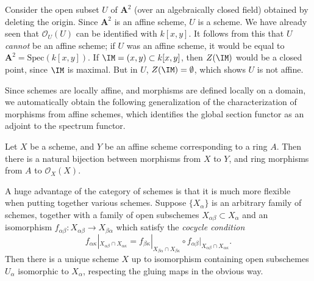 \begin{example}
    Consider the open subset $U$ of $\mathbf{A}^2$ (over an algebraically closed field) obtained by deleting the origin. Since $\mathbf{A}^2$ is an affine scheme, $U$ is a scheme. We have already seen that $\mathcal{O}_U(U)$ can be identified with $k[x,y]$. It follows from this that $U$ \emph{cannot} be an affine scheme; if $U$ was an affine scheme, it would be equal to $\mathbf{A}^2 = \text{Spec}(k[x,y])$. If $\IM = (x,y) \subset k[x,y]$, then $Z(\IM)$ would be a closed point, since $\IM$ is maximal. But in $U$, $Z(\IM) = \emptyset$, which shows $U$ is not affine.
\end{example}

Since schemes are locally affine, and morphisms are defined locally on a domain, we automatically obtain the following generalization of the characterization of morphisms from affine schemes, which identifies the global section functor as an adjoint to the spectrum functor.

\begin{theorem}
    Let $X$ be a scheme, and $Y$ be an affine scheme corresponding to a ring $A$. Then there is a natural bijection between morphisms from $X$ to $Y$, and ring morphisms from $A$ to $\mathcal{O}_X(X)$.
\end{theorem}

A huge advantage of the category of schemes is that it is much more flexible when putting together various schemes. Suppose $\{ X_\alpha \}$ is an arbitrary family of schemes, together with a family of open subschemes $X_{\alpha\beta} \subset X_\alpha$ and an isomorphism $f_{\alpha \beta}: X_{\alpha \beta} \to X_{\beta \alpha}$ which satisfy the \emph{cocycle condition}
%
\[ f_{\alpha \kappa}|_{X_{\alpha \beta} \cap X_{\alpha \kappa}} = f_{\beta \kappa}|_{X_{\beta \alpha} \cap X_{\beta \kappa}} \circ f_{\alpha \beta}|_{X_{\alpha \beta} \cap X_{\alpha \kappa}}. \]
%
Then there is a unique scheme $X$ up to isomorphism containing open subschemes $U_\alpha$ isomorphic to $X_\alpha$, respecting the gluing maps in the obvious way.

